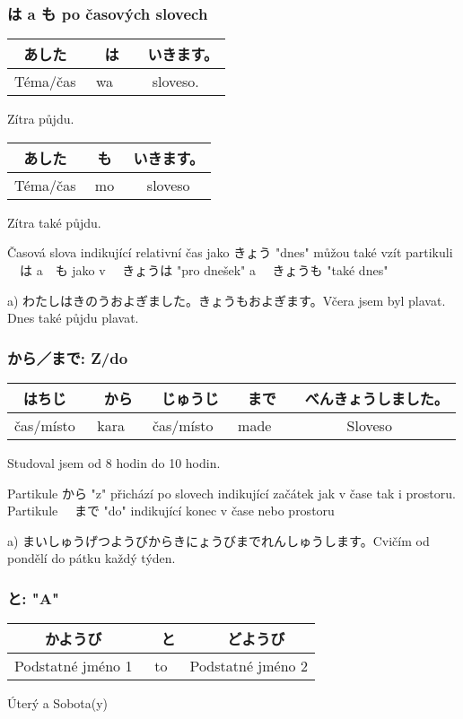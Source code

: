 \subsubsection{は a も po časových slovech}
\begin{center}
\begin{tabular}{||c|c||c||}
\hline
あした&　は&　いきます。\\
\hline
Téma/čas & wa & sloveso.\\
\hline
\end{tabular}
\end{center}
Zítra půjdu.

\begin{center}
\begin{tabular}{||c|c||c||}
\hline
あした　&も　&いきます。\\
\hline
Téma/čas & mo & sloveso\\
\hline
\end{tabular}
\end{center}
Zítra také půjdu.

Časová slova indikující relativní čas jako きょう "dnes" můžou také vzít partikuli 　は a　も jako v 　きょうは "pro dnešek" a 　きょうも "také dnes"

a) わたしはきのうおよぎました。きょうもおよぎます。Včera jsem byl plavat. Dnes také půjdu plavat.

\subsubsection{から／まで: Z/do}
\begin{center}
\begin{tabular}{||c|c||c|c||c||}
\hline
はちじ&　から&　じゅうじ&　まで&　べんきょうしました。\\
\hline
čas/místo & kara & čas/místo & made & Sloveso\\
\hline
\end{tabular}
\end{center}
Studoval jsem od 8 hodin do 10 hodin.


Partikule から "z" přichází po slovech indikující začátek jak v čase tak i prostoru. Partikule 　まで "do" indikující konec v čase nebo prostoru　

a) まいしゅうげつようびからきにょうびまでれんしゅうします。Cvičím od pondělí do pátku každý týden.


\subsubsection{と: "A"}
\begin{center}
\begin{tabular}{||c|c|c||}
\hline
かようび&　と&　どようび\\
\hline
Podstatné jméno 1 & to & Podstatné jméno 2\\
\hline
\end{tabular}
\end{center}
Úterý a Sobota(y)


